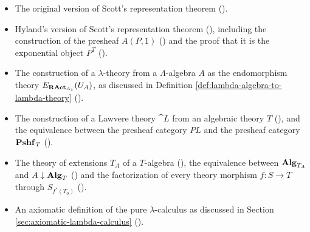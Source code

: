 \begin{itemize}
  \item The original version of Scott's representation theorem ().
  \item Hyland's version of Scott's representation theorem (), including the construction of the presheaf $ A(P, 1) $ () and the proof that it is the exponential object $ P^T $ ().
  \item The construction of a $ \lambda $-theory from a $ \Lambda $-algebra $ A $ as the endomorphism theory $ E_{\mathbf{RAct}_{A_1}}(U_A) $, as discussed in Definition \ref{def:lambda-algebra-to-lambda-theory} ().
  \item The construction of a Lawvere theory $ \cat L $ from an algebraic theory $ T $ (), and the equivalence between the presheaf category $ PL $ and the presheaf category $ \mathbf{Pshf}_{T} $ ().
  \item The theory of extensions $ T_A $ of a $ T $-algebra (), the equivalence between $ \mathbf{Alg}_{T_A} $ and $ A \downarrow \mathbf{Alg}_{T} $ () and the factorization of every theory morphism $ f: S \to T $ through $ S_{f^*(T_0)} $ ().
  \item An axiomatic definition of the pure $ \lambda $-calculus as discussed in Section \ref{sec:axiomatic-lambda-calculus} ().
\end{itemize}

